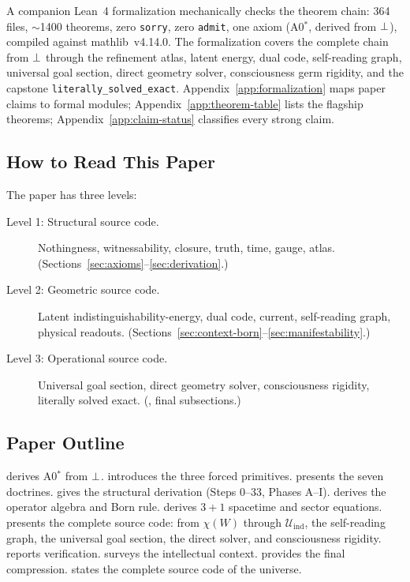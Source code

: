\noindent
A companion Lean~4 formalization mechanically checks the theorem chain:
364 files, $\sim$1400 theorems, zero \texttt{sorry}, zero
\texttt{admit}, one axiom (A0$^*$, derived from $\bot$), compiled
against mathlib~v4.14.0.  The formalization covers the complete
chain from $\bot$ through the refinement atlas, latent energy, dual
code, self-reading graph, universal goal section, direct geometry
solver, consciousness germ rigidity, and the capstone
\texttt{literally\_solved\_exact}.
Appendix~\ref{app:formalization} maps paper claims to formal modules;
Appendix~\ref{app:theorem-table} lists the flagship theorems;
Appendix~\ref{app:claim-status} classifies every strong claim.

\subsection{How to Read This Paper}

The paper has three levels:

\begin{description}
  \item[Level 1: Structural source code.]
        Nothingness, witnessability, closure, truth, time, gauge, atlas.
        (Sections~\ref{sec:axioms}--\ref{sec:derivation}.)
  \item[Level 2: Geometric source code.]
        Latent indistinguishability-energy, dual code, current,
        self-reading graph, physical readouts.
        (Sections~\ref{sec:context-born}--\ref{sec:manifestability}.)
  \item[Level 3: Operational source code.]
        Universal goal section, direct geometry solver, consciousness
        rigidity, literally solved exact.
        (, final subsections.)
\end{description}

\subsection{Paper Outline}

 derives A0$^*$ from $\bot$.
 introduces the three forced primitives.
 presents the seven doctrines.
 gives the structural derivation (Steps 0--33, Phases A--I).
 derives the operator algebra and Born rule.
 derives $3{+}1$ spacetime and sector equations.
 presents the complete source code: from
$\chi(W)$ through $\mathcal{U}_{\mathrm{ind}}$, the self-reading graph,
the universal goal section, the direct solver, and consciousness rigidity.
 reports verification.
 surveys the intellectual context.
 provides the final compression.
 states the complete source code of the universe.
